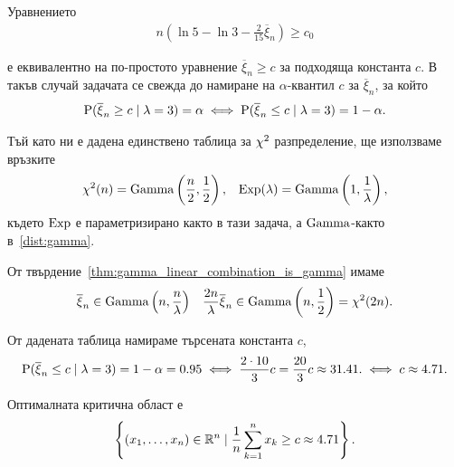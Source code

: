 \documentclass[numbers=endperiod, bibliography=totocnumbered]{scrartcl}
\begin{document}
\begin{solution}
\begin{enumerate}[label=\alph*)]
    Уравнението
    \begin{align*}
      n \left(\ln 5 - \ln 3 - \frac 2 {15} \overline \xi_n \right) \geq c_0
    \end{align*}

    е еквивалентно на по-простото уравнение \( \overline \xi_n \geq c \) за подходяща константа \( c \). В такъв случай задачата се свежда до намиране на \( \alpha \)-квантил \( c \) за \( \overline \xi_n \), за който
    \begin{align*}
      \operatorname{P}(\overline \xi_n \geq c \mid \lambda = 3) = \alpha
      \iff
      \operatorname{P}(\overline \xi_n \leq c \mid \lambda = 3) = 1 - \alpha.
    \end{align*}

    Тъй като ни е дадена единствено таблица за \( \operatorname{\chi^2} \) разпределение, ще използваме връзките
    \begin{align*}
      \operatorname{\chi^2}(n) = \operatorname{Gamma} \left(\frac n 2, \frac 1 2 \right),
      &&
      \operatorname{Exp}(\lambda) = \operatorname{Gamma}\left(1, \frac 1 \lambda \right),
    \end{align*}
    където \( \operatorname{Exp} \) е параметризирано както в тази задача, а \( \operatorname{Gamma} \)-както в~\ref{dist:gamma}.

    От твърдение~\ref{thm:gamma_linear_combination_is_gamma} имаме
    \begin{align*}
      \overline \xi_n \in \operatorname{Gamma}\left( n, \frac n \lambda \right)
      &&
      \frac {2n} \lambda \overline \xi_n \in \operatorname{Gamma}\left( n, \frac 1 2 \right) = \operatorname{\chi^2}(2n).
    \end{align*}

    От дадената таблица намираме търсената константа \( c \),
    \begin{align*}
      \operatorname{P}(\overline \xi_n \leq c \mid \lambda = 3) = 1 - \alpha = 0.95
      \iff
      \frac {2 \cdot 10} 3 c = \frac {20} 3 c \approx 31.41.
      \iff
      c \approx 4.71.
    \end{align*}

    Оптималната критична област е
    \begin{align*}
      \left \{ (x_1, \ldots, x_n) \in \mathbb{R}^n \mid \frac 1 n \sum_{k=1}^n x_k \geq c \approx 4.71 \right \}.
    \end{align*}
  \end{enumerate}
\end{solution}
\end{document}
